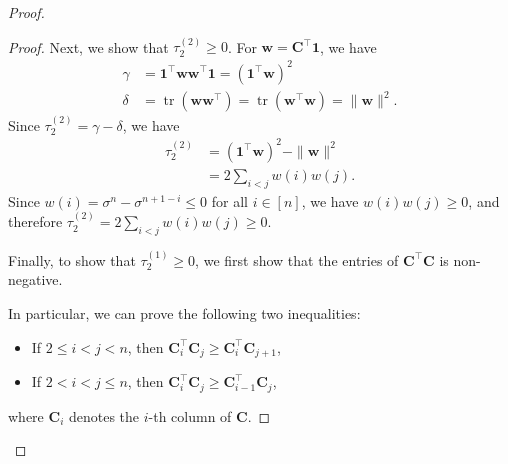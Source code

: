 \documentclass{article}
\theoremstyle{plain}
\theoremstyle{definition}
\theoremstyle{remark}
\def\vone{{\bm{1}}}
\def\vw{{\bm{w}}}
\def\mC{{\bm{C}}}
\DeclareMathOperator{\tr}{tr}
\begin{document}
\begin{proof}
\begin{proof}
    Next, we show that $\tau_2^{(2)}\ge 0$. For $\vw = \mC^{\top} \vone$, we have 
    \begin{align*}
        \gamma &= \vone^{\top} \vw \vw^{\top} \vone = (\vone^{\top} \vw)^2 \\
        \delta &= \tr(\vw \vw^{\top}) = \tr(\vw^{\top} \vw) = \|\vw\|^2.
    \end{align*}
    Since $\tau_2^{(2)} = \gamma - \delta$, we have
    \begin{align*}
        \tau_2^{(2)} &= (\vone^{\top} \vw)^2 - \|\vw\|^2 \\
        &= 2\sum_{i<j} w(i) w(j).
    \end{align*}
    Since $w(i) = \sigma^n - \sigma^{n+1-i} \le 0$ for all $i\in [n]$, we have $w(i) w(j) \ge 0$, and therefore $\tau_2^{(2)} = 2\sum_{i<j} w(i) w(j) \ge 0$.

    Finally, to show that $\tau_2^{(1)}\ge 0$, we first show that the entries of $\mC^{\top} \mC$ is non-negative.
    
    In particular, we can prove the following two inequalities:
    \begin{itemize}
        \item If $2 \le i < j < n$, then $\mC_i^{\top} \mC_j \ge \mC_i^{\top} \mC_{j+1}$,
        \item If $2 < i < j \le n$, then $\mC_i^{\top} \mC_j \ge \mC_{i-1}^{\top} \mC_j$,
    \end{itemize}
    where $\mC_i$ denotes the $i$-th column of $\mC$.
    

\end{proof}
\end{proof}
\end{document}
